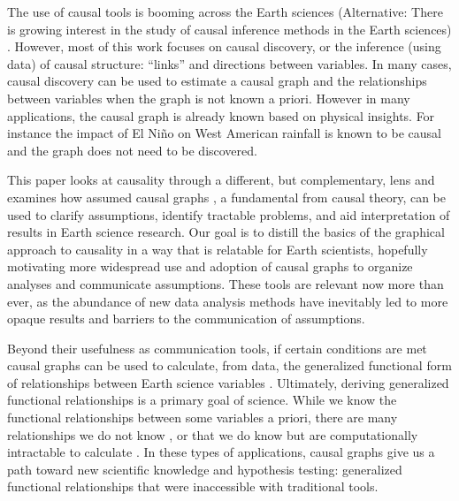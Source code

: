 \documentclass[12pt]{article}
\begin{document}
The use of causal tools is booming across the Earth sciences
(Alternative: There is growing interest in the study of causal
inference methods in the Earth sciences) \citep[e.g.,][]{salvucci2002,
  ebert-uphoff2012, kretschmer2016,
  samarasinghe2020,runge-causal-timeseries,runge2019inferring,goodwell-causality-2020}. However,
most of this work focuses on causal discovery, or the inference (using
data) of causal structure: ``links'' and directions between
variables. In many cases, causal discovery can be used to estimate a
causal graph and the relationships between variables when the graph is
not known a priori. However in many applications, the causal graph is
already known based on physical insights. For instance the impact of
El Ni\~{n}o on West American rainfall is known to be causal and the
graph does not need to be discovered.

This paper looks at causality through a different, but complementary,
lens and examines how assumed causal graphs \citep{pearl1995causal}, a
fundamental from causal theory, can be used to clarify assumptions,
identify tractable problems, and aid interpretation of results in
Earth science research. Our goal is to distill \citep{olah2017} the
basics of the graphical approach to causality in a way that is
relatable for Earth scientists, hopefully motivating more widespread
use and adoption of causal graphs to organize analyses and communicate
assumptions. These tools are relevant now more than ever, as the
abundance of new data analysis methods have inevitably led to more
opaque results and barriers to the communication of assumptions.

Beyond their usefulness as communication tools, if certain conditions
are met causal graphs can be used to calculate, from data, the
generalized functional form of relationships between Earth science
variables \citep{pearl2009causality}. Ultimately, deriving generalized
functional relationships is a primary goal of science. While we know
the functional relationships between some variables a priori, there
are many relationships we do not know \citep[e.g., ecosystem scale
water and carbon fluxes;][]{massmann2019, zhou2019arid,
  zhou2019feedback, grossiord2020}, or that we do know but are
computationally intractable to calculate \citep[e.g., clouds and
microphysics at the global scale:][]{randall2003, gentine2018,
  zadra2018, gagne2020emulation}. In these types of applications,
causal graphs give us a path toward new scientific knowledge and
hypothesis testing: generalized functional relationships that were
inaccessible with traditional tools.
\end{document}
